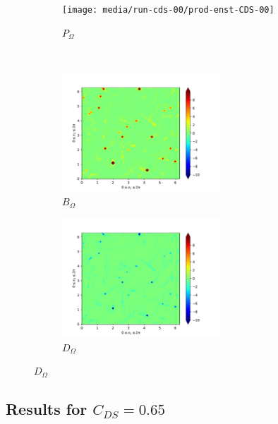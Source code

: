 \begin{figure}[H]
\begin{subfigure}{0.45\textwidth}
        \texttt{[image: media/run-cds-00/prod-enst-CDS-00]}
        \caption{$P_{\Omega}$}
    \end{subfigure}
    ~
    \begin{subfigure}{0.45\textwidth}
        \includegraphics[height=1.75in]{media/run-cds-00/B-enst-CDS-00}
        \caption{$B_{\Omega}$}
    \end{subfigure}
    \newline
    \begin{subfigure}{0.45\textwidth}
        \includegraphics[height=1.75in]{media/run-cds-00/D-enst-CDS-00}
        \caption{$D_{\Omega}$}
    \end{subfigure}
\end{figure}

\subsection{Results for $C_{DS}=0.65$}
